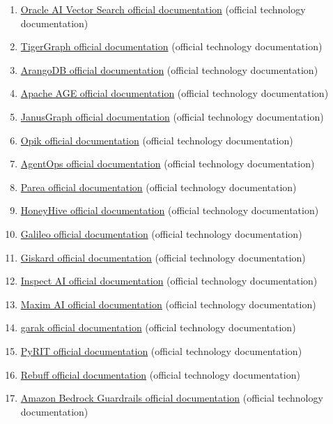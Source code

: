 \begin{enumerate}
\item \href{https://docs.oracle.com/en/database/oracle/oracle-database/23/vecse/}{Oracle AI Vector Search official documentation} (official technology documentation)
\item \href{https://docs.tigergraph.com/}{TigerGraph official documentation} (official technology documentation)
\item \href{https://docs.arangodb.com/}{ArangoDB official documentation} (official technology documentation)
\item \href{https://age.apache.org/age-manual/master/intro/overview.html}{Apache AGE official documentation} (official technology documentation)
\item \href{https://docs.janusgraph.org/}{JanusGraph official documentation} (official technology documentation)
\item \href{https://www.comet.com/docs/opik/}{Opik official documentation} (official technology documentation)
\item \href{https://docs.agentops.ai/}{AgentOps official documentation} (official technology documentation)
\item \href{https://docs.parea.ai/}{Parea official documentation} (official technology documentation)
\item \href{https://docs.honeyhive.ai/}{HoneyHive official documentation} (official technology documentation)
\item \href{https://docs.galileo.ai/}{Galileo official documentation} (official technology documentation)
\item \href{https://docs.giskard.ai/}{Giskard official documentation} (official technology documentation)
\item \href{https://inspect.aisi.org.uk/}{Inspect AI official documentation} (official technology documentation)
\item \href{https://www.getmaxim.ai/docs/}{Maxim AI official documentation} (official technology documentation)
\item \href{https://reference.garak.ai/en/latest/}{garak official documentation} (official technology documentation)
\item \href{https://azure.github.io/PyRIT/}{PyRIT official documentation} (official technology documentation)
\item \href{https://github.com/protectai/rebuff}{Rebuff official documentation} (official technology documentation)
\item \href{https://docs.aws.amazon.com/bedrock/latest/userguide/guardrails.html}{Amazon Bedrock Guardrails official documentation} (official technology documentation)

\end{enumerate}
